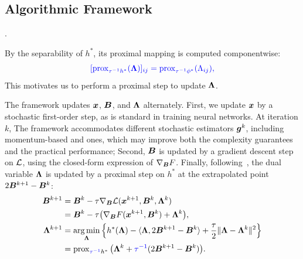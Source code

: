 \section{}
\label{Sec: DualHash framework}
\subsection{Algorithmic Framework}
. 

 By the separability of $h^*$, its proximal mapping is computed componentwise:
\begin{equation}
\label{Eq: the proximal mapping of conjugate function}
\blue{[\operatorname{prox}_{\tau^{-1} h^*}(\bLmbd)]_{ij}
=\operatorname{prox}_{\tau^{-1}\phi^*}(\Lambda_{ij}),}
\end{equation}
 This motivates us to perform a proximal step to update $\bm{\Lambda}$.

The framework updates $\bm{x}$, $\bm{B}$, and $\bm{\Lambda}$ alternately.
First, we update $\bm{x}$ by a stochastic first-order step, as is standard in training neural networks. At iteration $k$, 
The framework accommodates different stochastic estimators $\bm{g}^k$, including momentum-based and  ones, which may improve both the complexity guarantees and the practical performance;  Second, $\bm{B}$ is updated by a gradient descent step on $\mathcal{L}$, using the closed-form expression of $\nabla_{\bm{B}}F$. Finally, following~\cite{chambolleFirstOrderPrimalDualAlgorithm2011}, the dual variable $\bm{\Lambda}$ is updated by a proximal step on $h^*$ at the extrapolated point $2\bm{B}^{k+1}-\bm{B}^k$:
\begin{align}
\bB^{k+1} &= \bB^k - \tau \nabla_{\bB}\calL(\bx^{k+1},\bB^k,\bLmbd^k) \notag\\
&= \bB^k - \tau\big(\nabla_{\bB}F(\bx^{k+1},\bB^k)+\bLmbd^k\big), \label{Eq: the update of B}\\
\bLmbd^{k+1} &= \operatorname*{arg\,min}_{\bLmbd}\Big\{h^*(\bLmbd)-\langle\bLmbd,2\bB^{k+1}-\bB^k\rangle+\frac{\tau}{2}\|\bLmbd-\bLmbd^k\|^2\Big\} \notag\\
&= \operatorname{prox}_{\blue{\tau^{-1}}h^*}\big(\bLmbd^k+\blue{\tau^{-1}}(2\bB^{k+1}-\bB^k)\big). \label{Eq: the update of lambda}
\end{align}


